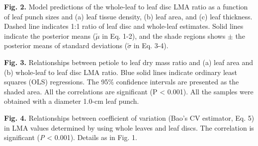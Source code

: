 \documentclass[
  12pt,
  a4paper,
,tablecaptionabove
]{scrartcl}
\providecommand{\DIFdelbegin}{} %
\providecommand{\DIFdelend}{} %
\begin{document}
\DIFdelbegin %


\DIFdelend \textbf{Fig. 2.}
Model predictions of the whole-leaf to leaf disc LMA ratio as a function of leaf punch sizes and (a) leaf tissue density, (b) leaf area, and (c) leaf thickness.
Dashed line indicates 1:1 ratio of leaf disc and whole-leaf estimates.
Solid lines indicate the posterior means (\(\tilde{\mu}\) in Eq. 1-2), and the shade regions shows \(\pm\) the posterior means of standard deviations (\(\tilde{\sigma}\) in Eq. 3-4).

\DIFdelbegin %


\DIFdelend \textbf{Fig. 3.}
Relationships between petiole to leaf dry mass ratio and (a) leaf area and (b) whole-leaf to leaf disc LMA ratio.
Blue solid lines indicate ordinary least squares (OLS) regressions.
The 95\% confidence intervals are presented as the shaded area.
All the correlations are significant (P \textless{} 0.001).
All the samples were obtained with a diameter 1.0-cm leaf punch.

\DIFdelbegin %


\DIFdelend \textbf{Fig. 4.}
Relationships between coefficient of variation (Bao's CV estimator, Eq. 5) in LMA values determined by using whole leaves and leaf discs.
The correlation is significant (\emph{P} \textless{} 0.001).
Details as in Fig. 1.
\DIFdelbegin %

\DIFdelend 
\end{document}
